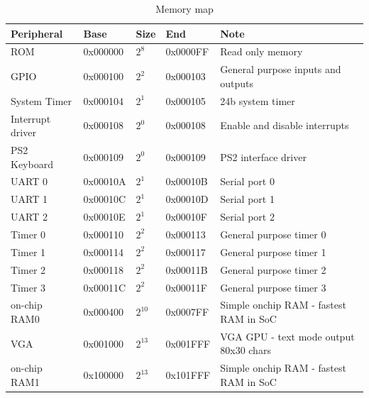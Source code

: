 \begin{table}[]
    \centering
    \begin{tabular}{|l|l|l|l|l|}
        \hline
        \textbf{Peripheral} & \textbf{Base} & \textbf{Size} & \textbf{End} & \textbf{Note}                                  \\ \hline
        ROM                 & 0x000000      & $2^{8}$       & 0x0000FF     & Read only memory                               \\ \hline
        GPIO                & 0x000100      & $2^{2}$       & 0x000103     & General purpose inputs and outputs             \\ \hline
        System Timer        & 0x000104      & $2^{1}$       & 0x000105     & 24b system timer                               \\ \hline
        Interrupt driver    & 0x000108      & $2^{0}$       & 0x000108     & Enable and disable interrupts                  \\ \hline
        PS2 Keyboard        & 0x000109      & $2^{0}$       & 0x000109     & PS2 interface driver                           \\ \hline
        UART 0              & 0x00010A      & $2^{1}$       & 0x00010B     & Serial port 0                                  \\ \hline
        UART 1              & 0x00010C      & $2^{1}$       & 0x00010D     & Serial port 1                                  \\ \hline
        UART 2              & 0x00010E      & $2^{1}$       & 0x00010F     & Serial port 2                                  \\ \hline
        Timer 0             & 0x000110      & $2^{2}$       & 0x000113     & General purpose timer 0                        \\ \hline
        Timer 1             & 0x000114      & $2^{2}$       & 0x000117     & General purpose timer 1                        \\ \hline
        Timer 2             & 0x000118      & $2^{2}$       & 0x00011B     & General purpose timer 2                        \\ \hline
        Timer 3             & 0x00011C      & $2^{2}$       & 0x00011F     & General purpose timer 3                        \\ \hline
        on-chip RAM0        & 0x000400      & $2^{10}$      & 0x0007FF     & Simple onchip RAM - fastest RAM in SoC         \\ \hline
        VGA                 & 0x001000      & $2^{13}$      & 0x001FFF     & VGA GPU - text mode output 80x30 chars         \\ \hline
        on-chip RAM1        & 0x100000      & $2^{13}$      & 0x101FFF     & Simple onchip RAM - fastest RAM in SoC         \\ \hline
    \end{tabular}
    \caption{Memory map}
    \label{tab:memory_map}
\end{table}

